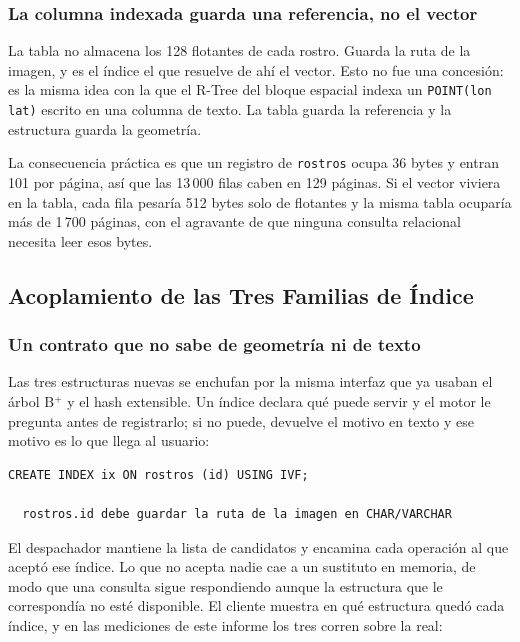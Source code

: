 \subsubsection{La columna indexada guarda una referencia, no el vector}

La tabla no almacena los 128 flotantes de cada rostro. Guarda la ruta de la
imagen, y es el índice el que resuelve de ahí el vector. Esto no fue una
concesión: es la misma idea con la que el R-Tree del bloque espacial indexa un
\texttt{POINT(lon lat)} escrito en una columna de texto. La tabla guarda la
referencia y la estructura guarda la geometría.

La consecuencia práctica es que un registro de \texttt{rostros} ocupa 36 bytes y
entran 101 por página, así que las 13\,000 filas caben en 129 páginas. Si el
vector viviera en la tabla, cada fila pesaría 512 bytes solo de flotantes y la
misma tabla ocuparía más de 1\,700 páginas, con el agravante de que ninguna
consulta relacional necesita leer esos bytes.

\subsection{Acoplamiento de las Tres Familias de Índice}

\subsubsection{Un contrato que no sabe de geometría ni de texto}

Las tres estructuras nuevas se enchufan por la misma interfaz que ya usaban el
árbol B$^+$ y el hash extensible. Un índice declara qué puede servir y el motor
le pregunta antes de registrarlo; si no puede, devuelve el motivo en texto y ese
motivo es lo que llega al usuario:

\begin{lstlisting}[caption={Motivo de rechazo de un índice}]
CREATE INDEX ix ON rostros (id) USING IVF;

  rostros.id debe guardar la ruta de la imagen en CHAR/VARCHAR
\end{lstlisting}

El despachador mantiene la lista de candidatos y encamina cada operación al que
aceptó ese índice. Lo que no acepta nadie cae a un sustituto en memoria, de modo
que una consulta sigue respondiendo aunque la estructura que le correspondía no
esté disponible. El cliente muestra en qué estructura quedó cada índice, y en
las mediciones de este informe los tres corren sobre la real:

